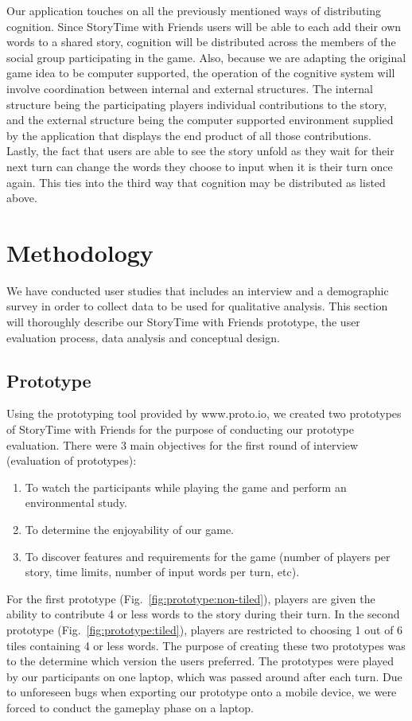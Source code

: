 \documentclass{sigchi}
\begin{document}
Our application touches on all the previously mentioned ways of distributing cognition. Since StoryTime with Friends users will be able to each add their own words to a shared story, cognition will be distributed across the members of the social group participating in the game. Also, because we are adapting the original game idea to be computer supported, the operation of the cognitive system will involve coordination between internal and external structures. The internal structure being the participating players individual contributions to the story, and the external structure being the computer supported environment supplied by the application that displays the end product of all those contributions. Lastly, the fact that users are able to see the story unfold as they wait for their next turn can change the words they choose to input when it is their turn once again. This ties into the third way that cognition may be distributed as listed above.


\section{Methodology}
We have conducted user studies that includes an interview and a demographic survey in order to collect data to be used for qualitative analysis. This section will thoroughly describe our StoryTime with Friends prototype, the user evaluation process, data analysis and conceptual design.

\subsection{Prototype}
Using the prototyping tool provided by www.proto.io, we created two prototypes of StoryTime with Friends for the purpose of conducting our prototype evaluation. There were 3 main objectives for the first round of interview (evaluation of prototypes):

\begin{enumerate}[leftmargin=.5in,noitemsep]
\item To watch the participants while playing the game and perform an environmental study.
\item To determine the enjoyability of our game.
\item To discover features and requirements for the game (number of players per story, time limits, number of input words per turn, etc).
\end{enumerate}

For the first prototype (Fig.\@~\ref{fig:prototype:non-tiled}), players are given the ability to contribute 4 or less words to the story during their turn. In the second prototype (Fig.\@~\ref{fig:prototype:tiled}), players are restricted to choosing 1 out of 6 tiles containing 4 or less words. The purpose of creating these two prototypes was to the determine which version the users preferred. The prototypes were played by our participants on one laptop, which was passed around after each turn. Due to unforeseen bugs when exporting our prototype onto a mobile device, we were forced to conduct the gameplay phase on a laptop. 
\end{document}
